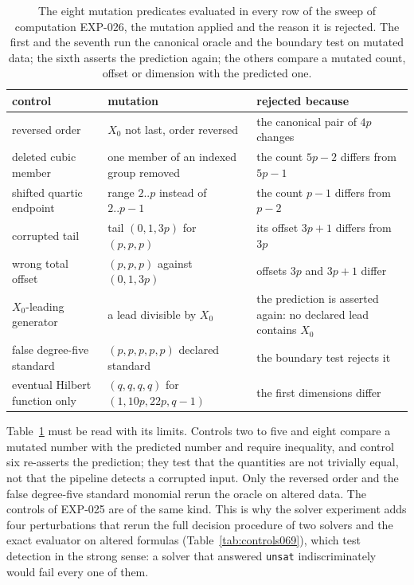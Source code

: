 \documentclass[11pt]{article}
\theoremstyle{definition}
\theoremstyle{remark}
\begin{document}
\begin{table}[ht]
\centering
\small
\begin{tabular}{@{}>{\raggedright\arraybackslash}p{}>{\raggedright\arraybackslash}p{}>{\raggedright\arraybackslash}p{}@{}}
\toprule
control & mutation & rejected because\\
\midrule
reversed order & $X_0$ not last, order reversed & the canonical pair of $4p$ changes\\
deleted cubic member & one member of an indexed group removed & the count $5p-2$ differs from $5p-1$\\
shifted quartic endpoint & range $2..p$ instead of $2..p-1$ & the count $p-1$ differs from $p-2$\\
corrupted tail & tail $(0,1,3p)$ for $(p,p,p)$ & its offset $3p+1$ differs from $3p$\\
wrong total offset & $(p,p,p)$ against $(0,1,3p)$ & offsets $3p$ and $3p+1$ differ\\
$X_0$-leading generator & a lead divisible by $X_0$ & the prediction is asserted again: no declared lead contains $X_0$\\
false degree-five standard & $(p,p,p,p,p)$ declared standard & the boundary test rejects it\\
eventual Hilbert function only & $(q,q,q,q)$ for $(1,10p,22p,q-1)$ & the first dimensions differ\\
\bottomrule
\end{tabular}
\caption{The eight mutation predicates evaluated in every row of the sweep of computation EXP-026,
the mutation applied and the reason it is rejected. The first and the seventh run the canonical
oracle and the boundary test on mutated data; the sixth asserts the prediction again; the others
compare a mutated count, offset or dimension with the predicted one.}
\label{tab:controls026}
\end{table}

Table~\ref{tab:controls026} must be read with its limits. Controls two to five and eight compare a
mutated number with the predicted number and require inequality, and control six re-asserts the
prediction; they test that the quantities are not trivially equal, not that the pipeline detects a
corrupted input. Only the reversed
order and the false degree-five standard monomial rerun the oracle on altered data. The controls
of EXP-025 are of the same kind. This is why the solver experiment adds four perturbations that rerun
the full decision procedure of two solvers and the exact evaluator on altered formulas
(Table~\ref{tab:controls069}), which test detection in the strong sense: a solver that answered
\texttt{unsat} indiscriminately would fail every one of them.
\end{document}
